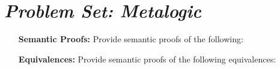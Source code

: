 \documentclass[a4paper, 11pt]{article} %
\begin{document}
\section*{\it Problem Set: Metalogic}

\begin{enumerate}[leftmargin=1.2in]
	\item[\bf Semantic Proofs:] Provide semantic proofs of the following:
    \begin{enumerate}[label=\arabic*.]\small
    \end{enumerate}
	\item[\bf Equivalences:] Provide semantic proofs of the following equivalences:
    \begin{enumerate}[label=(\arabic*),resume]\small
    \end{enumerate}

\end{enumerate}
\end{document}
